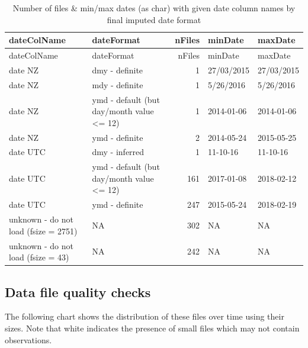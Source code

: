 \documentclass[]{article}
\begin{document}
\begin{longtable}[]{@{}llrll@{}}
\caption{Number of files \& min/max dates (as char) with given date
column names by final imputed date format}\tabularnewline
\toprule
dateColName & dateFormat & nFiles & minDate & maxDate\tabularnewline
\midrule
\endfirsthead
\toprule
dateColName & dateFormat & nFiles & minDate & maxDate\tabularnewline
\midrule
\endhead
date NZ & dmy - definite & 1 & 27/03/2015 & 27/03/2015\tabularnewline
date NZ & mdy - definite & 1 & 5/26/2016 & 5/26/2016\tabularnewline
date NZ & ymd - default (but day/month value \textless{}= 12) & 1 &
2014-01-06 & 2014-01-06\tabularnewline
date NZ & ymd - definite & 2 & 2014-05-24 & 2015-05-25\tabularnewline
date UTC & dmy - inferred & 1 & 11-10-16 & 11-10-16\tabularnewline
date UTC & ymd - default (but day/month value \textless{}= 12) & 161 &
2017-01-08 & 2018-02-12\tabularnewline
date UTC & ymd - definite & 247 & 2015-05-24 & 2018-02-19\tabularnewline
unknown - do not load (fsize = 2751) & NA & 302 & NA & NA\tabularnewline
unknown - do not load (fsize = 43) & NA & 242 & NA & NA\tabularnewline
\bottomrule
\end{longtable}

\subsection{Data file quality checks}\label{data-file-quality-checks}

The following chart shows the distribution of these files over time
using their sizes. Note that white indicates the presence of small files
which may not contain observations.
\end{document}
